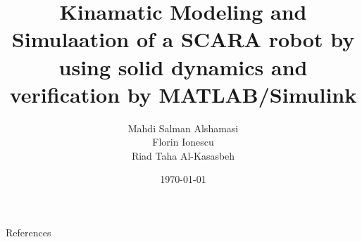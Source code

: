 \documentclass{beamer}
\title{Kinamatic Modeling and Simulaation of a SCARA robot by using solid dynamics and verification by MATLAB/Simulink}
\author{Mahdi Salman Alshamasi \\
Florin Ionescu \\
Riad Taha Al-Kasasbeh}
\institute{Facuty of Engeneering Technology, Jordan
}
\date{\today}
\begin{document}
 \begin{frame}[t]\maketitle\end{frame}







\nocite{*}
\begin{frame}{References}  


\end{frame}
\end{document}
